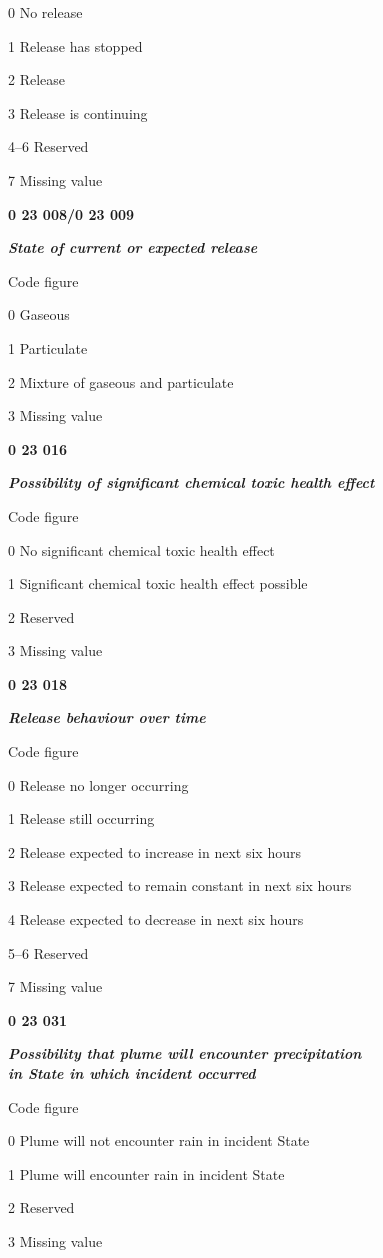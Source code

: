 0 No release

1 Release has stopped

2 Release

3 Release is continuing

4--6 Reserved

7 Missing value

\textbf{0 23 008/0 23 009}

\emph{\textbf{State of current or expected release}}

Code figure

0 Gaseous

1 Particulate

2 Mixture of gaseous and particulate

3 Missing value

\textbf{0 23 016}

\emph{\textbf{Possibility of significant chemical toxic health effect}}

Code figure

0 No significant chemical toxic health effect

1 Significant chemical toxic health effect possible

2 Reserved

3 Missing value

\textbf{0 23 018}

\emph{\textbf{Release behaviour over time}}

Code figure

0 Release no longer occurring

1 Release still occurring

2 Release expected to increase in next six hours

3 Release expected to remain constant in next six hours

4 Release expected to decrease in next six hours

5--6 Reserved

7 Missing value

\textbf{0 23 031}

\emph{\textbf{Possibility that plume will encounter precipitation\\
in State in which incident occurred}}

Code figure

0 Plume will not encounter rain in incident State

1 Plume will encounter rain in incident State

2 Reserved

3 Missing value

